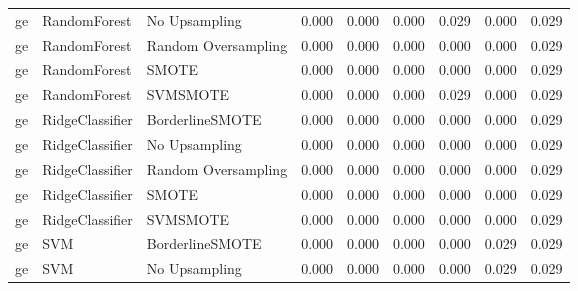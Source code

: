 \begin{tabular}{lllllllll}
      ge &                 RandomForest &       No Upsampling & 0.000 &                     0.000 &                 0.000 &                  0.029 &                                   0.000 &     0.029 \\
      ge &                 RandomForest & Random Oversampling & 0.000 &                     0.000 &                 0.000 &                  0.000 &                                   0.000 &     0.029 \\
      ge &                 RandomForest &               SMOTE & 0.000 &                     0.000 &                 0.000 &                  0.000 &                                   0.000 &     0.029 \\
      ge &                 RandomForest &            SVMSMOTE & 0.000 &                     0.000 &                 0.000 &                  0.029 &                                   0.000 &     0.029 \\
      ge &              RidgeClassifier &     BorderlineSMOTE & 0.000 &                     0.000 &                 0.000 &                  0.000 &                                   0.000 &     0.029 \\
      ge &              RidgeClassifier &       No Upsampling & 0.000 &                     0.000 &                 0.000 &                  0.000 &                                   0.000 &     0.029 \\
      ge &              RidgeClassifier & Random Oversampling & 0.000 &                     0.000 &                 0.000 &                  0.000 &                                   0.000 &     0.029 \\
      ge &              RidgeClassifier &               SMOTE & 0.000 &                     0.000 &                 0.000 &                  0.000 &                                   0.000 &     0.029 \\
      ge &              RidgeClassifier &            SVMSMOTE & 0.000 &                     0.000 &                 0.000 &                  0.000 &                                   0.000 &     0.029 \\
      ge &                          SVM &     BorderlineSMOTE & 0.000 &                     0.000 &                 0.000 &                  0.000 &                                   0.029 &     0.029 \\
      ge &                          SVM &       No Upsampling & 0.000 &                     0.000 &                 0.000 &                  0.000 &                                   0.029 &     0.029 \\

\end{tabular}
